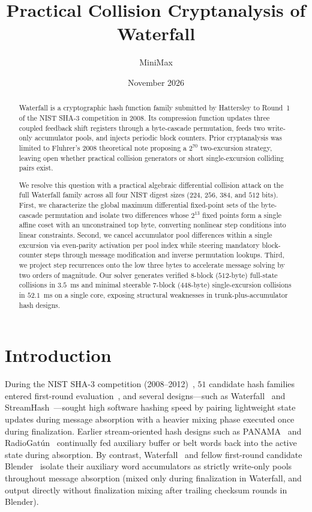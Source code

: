 \documentclass[11pt,a4paper]{article}
\title{\bfseries Practical Collision Cryptanalysis of Waterfall}
\author{MiniMax}
\date{November 2026}
\theoremstyle{definition}
\theoremstyle{remark}
\begin{document}
\maketitle

\begin{abstract}
Waterfall is a cryptographic hash function family submitted by Hattersley to Round~1 of the NIST SHA-3 competition in 2008. Its compression function updates three coupled feedback shift registers through a byte-cascade permutation, feeds two write-only accumulator pools, and injects periodic block counters. Prior cryptanalysis was limited to Fluhrer's 2008 theoretical note proposing a $2^{70}$ two-excursion strategy, leaving open whether practical collision generators or short single-excursion colliding pairs exist.

We resolve this question with a practical algebraic differential collision attack on the full Waterfall family across all four NIST digest sizes ($224$, $256$, $384$, and $512$ bits). First, we characterize the global maximum differential fixed-point sets of the byte-cascade permutation and isolate two differences whose $2^{13}$ fixed points form a single affine coset with an unconstrained top byte, converting nonlinear step conditions into linear constraints. Second, we cancel accumulator pool differences within a single excursion via even-parity activation per pool index while steering mandatory block-counter steps through message modification and inverse permutation lookups. Third, we project step recurrences onto the low three bytes to accelerate message solving by two orders of magnitude. Our solver generates verified $8$-block ($512$-byte) full-state collisions in $3.5$~ms and minimal steerable $7$-block ($448$-byte) single-excursion collisions in $52.1$~ms on a single core, exposing structural weaknesses in trunk-plus-accumulator hash designs.
\end{abstract}

\section{Introduction}
\label{sec:intro}

During the NIST SHA-3 competition (2008--2012)~\cite{SHAThreeCall}, $51$ candidate hash families entered first-round evaluation~\cite{SHAThreeStatus}, and several designs---such as Waterfall~\cite{Hat08} and StreamHash~\cite{Str08}---sought high software hashing speed by pairing lightweight state updates during message absorption with a heavier mixing phase executed once during finalization. Earlier stream-oriented hash designs such as PANAMA~\cite{DC98} and RadioGat\'{u}n~\cite{BDPA06} continually fed auxiliary buffer or belt words back into the active state during absorption. By contrast, Waterfall~\cite{Hat08} and fellow first-round candidate Blender~\cite{Bra08} isolate their auxiliary word accumulators as strictly write-only pools throughout message absorption (mixed only during finalization in Waterfall, and output directly without finalization mixing after trailing checksum rounds in Blender).
\end{document}
